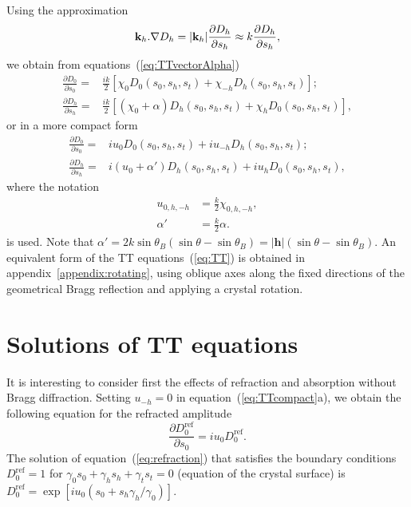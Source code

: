 \documentclass[preprint]{iucr}              %
\begin{document}
Using the approximation
\begin{equation}
\label{eq:approxKH}
\textbf k_h . \nabla D_h = |\textbf k_h| \frac{\partial D_h}{\partial s_h} \approx k \frac{\partial D_h}{ \partial s_h},
\end{equation}
we obtain from equations~(\ref{eq:TTvectorAlpha})
\begin{subequations}
\label{eq:TT}
\begin{align}
\frac{\partial D_0}{\partial s_0} =& \frac{ik}{2} \left[ \chi_0 D_0(s_0,s_h,s_t)+ \chi_{-h} D_h(s_0,s_h,s_t) \right]; \\
\frac{\partial D_h}{\partial s_h} =& \frac{ik}{2} \left[ (\chi_0 + \alpha) D_h(s_0,s_h,s_t)+ \chi_{h} D_0(s_0,s_h,s_t) \right],
\end{align}
\end{subequations}
or in a more compact form
\begin{subequations}
\label{eq:TTcompact}
\begin{align}
\frac{\partial D_0}{\partial s_0} =& i u_0 D_0(s_0,s_h,s_t) + i u_{-h} D_h(s_0,s_h,s_t); \\
\frac{\partial D_h}{\partial s_h} =& i (u_0 + \alpha') D_h(s_0,s_h,s_t) + i u_{h} D_0(s_0,s_h,s_t),
\end{align}
\end{subequations}
where the notation 
\begin{subequations}
\label{eq:uandalphaprime}
\begin{align}
    u_{0,h,-h}&=\frac{k}{2} \chi_{0,h,-h},  \\
     \alpha'  &= \frac{k}{2}  \alpha.
\end{align}
\end{subequations}
is used.
Note that $\alpha'=2 k \sin\theta_B(\sin\theta-\sin\theta_B)=|\textbf{h}|(\sin\theta-\sin\theta_B)$.
An equivalent form of the TT equations~(\ref{eq:TT}) is obtained in appendix~\ref{appendix:rotating}, using oblique axes along the fixed directions of the geometrical Bragg reflection and applying a crystal rotation.



%
\section{Solutions of TT equations}
\label{sec:TTsolutions}

It is interesting to consider first the effects of refraction and absorption without Bragg diffraction. 
Setting $u_{-h}=0$ in equation~(\ref{eq:TTcompact}a), we obtain the following equation for the refracted amplitude 
\begin{equation}\label{eq:refraction}
\frac{\partial D_0^{\text{ref}}}{\partial s_0} = i u_0 D_0^{\text{ref}}.
\end{equation}
The solution of equation~(\ref{eq:refraction}) that satisfies the boundary conditions $D_0^{\text{ref}}=1$ for  $\gamma_0 s_0 + \gamma_h s_h + \gamma_t s_t=0$ (equation of the crystal surface) is $D_0^{\text{ref}}= \exp[i u_0 (s_0 + s_h \gamma_h/\gamma_0)]$.
\end{document}
